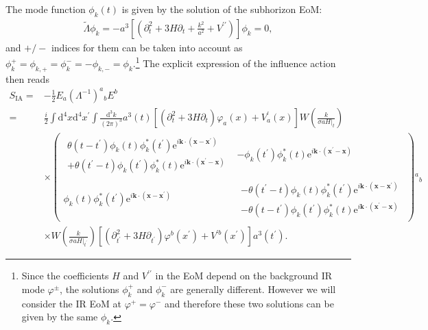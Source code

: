 \documentclass[aps, prd
, preprint
, nofootinbib 
]{revtex4-1}
\newcommand{\dd}{\mathrm{d}}
\newcommand{\ee}{\mathrm{e}}
\newcommand{\dk}{\frac{\dd^3k}{(2\pi)^3}}
\newcommand{\bae}[1]{\begin{align} #1 \end{align}}
\newcommand{\bpme}[1]{\begin{pmatrix} #1 \end{pmatrix}}
\begin{document}
The mode function $\phi_k(t)$ is given by the solution of the subhorizon EoM:
\bae{
	\tilde{\Lambda}\phi_k=-a^3\left[\left(\partial_t^2+3H\partial_t+\frac{k^2}{a^2}+V^{\prime\prime}\right)\right]\phi_k=0,
}
and $+/-$ indices for them can be taken into account as $\phi_k^+=\phi_{k,+}=\phi_k^-=-\phi_{k,-}=\phi_k$.\footnote{Since the coefficients
$H$ and $V^{\prime\prime}$ in the EoM depend on the background IR mode $\varphi^\pm$,
the solutions $\phi_k^+$ and $\phi_k^-$ are generally different. However we will consider the IR EoM at $\varphi^+=\varphi^-$
and therefore these two solutions can be given by the same $\phi_k$.}
The explicit expression of the influence action then reads
\bae{
	S_\text{IA}=&-\frac{1}{2}E_a(\Lambda^{-1})^a{}_bE^b \nonumber \\
	=&\frac{i}{2}\int\dd^4x\dd^4x^\prime\int\dk a^3(t)\left[(\partial_t^2+3H\partial_t)\varphi_a(x)+V^\prime_a(x)\right]
	W\left(\frac{k}{\sigma aH|_t}\right) \nonumber \\
	&\times\bpme{
		\begin{array}{c}
			\theta(t-t^\prime)\phi_k(t)\phi_{k}^*(t^\prime)\ee^{i\mathbf{k}\cdot(\mathbf{x}-\mathbf{x}^\prime)} \\
			+\theta(t^\prime-t)\phi_{k}(t^\prime)\phi_k^{*}(t)\ee^{i\mathbf{k}\cdot(\mathbf{x}^\prime-\mathbf{x})}
		\end{array} &
		-\phi_{k}(t^\prime)\phi_k^{*}(t)\ee^{i\mathbf{k}\cdot(\mathbf{x}^\prime-\mathbf{x})} \\
		\phi_k(t)\phi_{k}^*(t^\prime)\ee^{i\mathbf{k}\cdot(\mathbf{x}-\mathbf{x}^\prime)} &
		\begin{array}{c}
			-\theta(t^\prime-t)\phi_k(t)\phi_{k}^*(t^\prime)\ee^{i\mathbf{k}\cdot(\mathbf{x}-\mathbf{x}^\prime)} \\
			-\theta(t-t^\prime)\phi_{k}(t^\prime)\phi_k^{*}(t)\ee^{i\mathbf{k}\cdot(\mathbf{x}^\prime-\mathbf{x})}
		\end{array}
	}{}^a{}_b \nonumber \\
	&\times W\left(\frac{k}{\sigma aH|_{t^\prime}}\right)
	\left[(\partial_{t^\prime}^2+3H\partial_{t^\prime})\varphi^b(x^\prime)+V^{\prime b}(x^\prime)\right]a^3(t^\prime).
}
\end{document}
